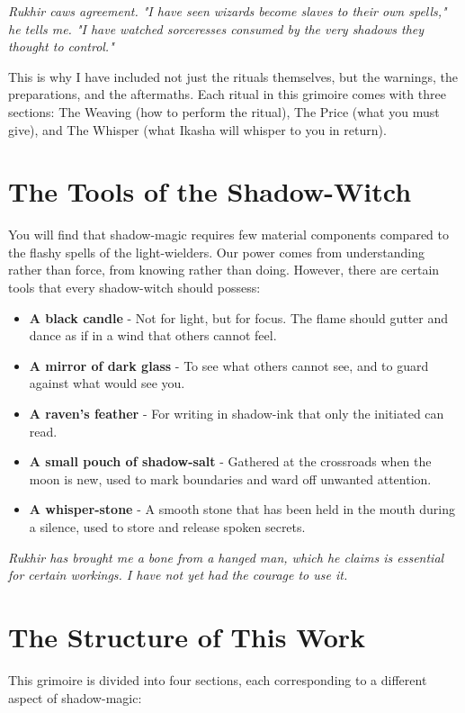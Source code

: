\documentclass[12pt,twoside]{book}
\newcommand{\shadow}[1]{\textit{#1}}
\begin{document}
\shadow{Rukhir caws agreement. "I have seen wizards become slaves to their own spells," he tells me. "I have watched sorceresses consumed by the very shadows they thought to control."}

This is why I have included not just the rituals themselves, but the warnings, the preparations, and the aftermaths. Each ritual in this grimoire comes with three sections: The Weaving (how to perform the ritual), The Price (what you must give), and The Whisper (what Ikasha will whisper to you in return).

\section*{The Tools of the Shadow-Witch}

You will find that shadow-magic requires few material components compared to the flashy spells of the light-wielders. Our power comes from understanding rather than force, from knowing rather than doing. However, there are certain tools that every shadow-witch should possess:

\begin{itemize}
\item \textbf{A black candle} - Not for light, but for focus. The flame should gutter and dance as if in a wind that others cannot feel.
\item \textbf{A mirror of dark glass} - To see what others cannot see, and to guard against what would see you.
\item \textbf{A raven's feather} - For writing in shadow-ink that only the initiated can read.
\item \textbf{A small pouch of shadow-salt} - Gathered at the crossroads when the moon is new, used to mark boundaries and ward off unwanted attention.
\item \textbf{A whisper-stone} - A smooth stone that has been held in the mouth during a silence, used to store and release spoken secrets.
\end{itemize}

\shadow{Rukhir has brought me a bone from a hanged man, which he claims is essential for certain workings. I have not yet had the courage to use it.}

\section*{The Structure of This Work}

This grimoire is divided into four sections, each corresponding to a different aspect of shadow-magic:
\end{document}
